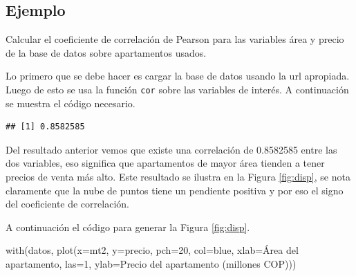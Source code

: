 \documentclass[
]{book}
\makeatletter
\newenvironment{Shaded}{\begin{snugshade}}{\end{snugshade}}
\newcommand{\AttributeTok}[1]{\textcolor[rgb]{0.77,0.63,0.00}{#1}}
\newcommand{\DecValTok}[1]{\textcolor[rgb]{0.00,0.00,0.81}{#1}}
\newcommand{\FunctionTok}[1]{\textcolor[rgb]{0.00,0.00,0.00}{#1}}
\newcommand{\NormalTok}[1]{#1}
\newcommand{\OtherTok}[1]{\textcolor[rgb]{0.56,0.35,0.01}{#1}}
\newcommand{\SpecialCharTok}[1]{\textcolor[rgb]{0.00,0.00,0.00}{#1}}
\newcommand{\StringTok}[1]{\textcolor[rgb]{0.31,0.60,0.02}{#1}}
\newenvironment{kframe}{%
\medskip{}
\setlength{\fboxsep}{.8em}
 \def\at@end@of@kframe{}%
 \ifinner\ifhmode%
  \def\at@end@of@kframe{\end{minipage}}%
  \begin{minipage}{\columnwidth}%
 \fi\fi%
 \def\FrameCommand##1{\hskip\@totalleftmargin \hskip-\fboxsep
 \colorbox{shadecolor}{##1}\hskip-\fboxsep
     \hskip-\linewidth \hskip-\@totalleftmargin \hskip\columnwidth}%
 \MakeFramed {\advance\hsize-\width
   \@totalleftmargin\z@ \linewidth\hsize
   \@setminipage}}%
 {\par\unskip\endMakeFramed%
 \at@end@of@kframe}
\renewenvironment{Shaded}{\begin{kframe}}{\end{kframe}}
\makeatother
\begin{document}
\hypertarget{ejemplo-43}{%
\subsection*{Ejemplo}\label{ejemplo-43}}

Calcular el coeficiente de correlación de Pearson para las variables área y precio de la base de datos sobre apartamentos usados.

Lo primero que se debe hacer es cargar la base de datos usando la url apropiada. Luego de esto se usa la función \texttt{cor} sobre las variables de interés. A continuación se muestra el código necesario.

\begin{Shaded}
\end{Shaded}

\begin{verbatim}
## [1] 0.8582585
\end{verbatim}

Del resultado anterior vemos que existe una correlación de 0.8582585 entre las dos variables, eso significa que apartamentos de mayor área tienden a tener precios de venta más alto. Este resultado se ilustra en la Figura \ref{fig:disp}, se nota claramente que la nube de puntos tiene un pendiente positiva y por eso el signo del coeficiente de correlación.

A continuación el código para generar la Figura \ref{fig:disp}.

\begin{Shaded}
\begin{Highlighting}[]
\FunctionTok{with}\NormalTok{(datos, }\FunctionTok{plot}\NormalTok{(}\AttributeTok{x=}\NormalTok{mt2, }\AttributeTok{y=}\NormalTok{precio, }\AttributeTok{pch=}\DecValTok{20}\NormalTok{, }\AttributeTok{col=}\StringTok{\textquotesingle{}blue\textquotesingle{}}\NormalTok{,}
                 \AttributeTok{xlab=}\StringTok{\textquotesingle{}Área del apartamento\textquotesingle{}}\NormalTok{, }\AttributeTok{las=}\DecValTok{1}\NormalTok{,}
                 \AttributeTok{ylab=}\StringTok{\textquotesingle{}Precio del apartamento (millones COP)\textquotesingle{}}\NormalTok{))}
\end{Highlighting}
\end{Shaded}
\end{document}
